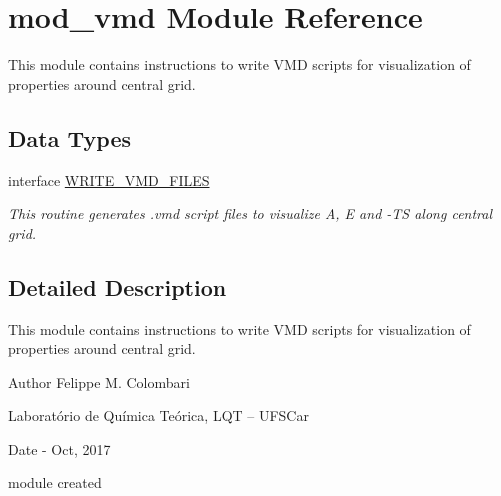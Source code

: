 \hypertarget{namespacemod__vmd}{}\section{mod\+\_\+vmd Module Reference}
\label{namespacemod__vmd}


This module contains instructions to write V\+MD scripts for visualization of properties around central grid.  


\subsection*{Data Types}
\begin{DoxyCompactItemize}
\item 
interface \hyperlink{interfacemod__vmd_1_1WRITE__VMD__FILES}{W\+R\+I\+T\+E\+\_\+\+V\+M\+D\+\_\+\+F\+I\+L\+ES}
\begin{DoxyCompactList}\small\item\em This routine generates .vmd script files to visualize A, E and -\/\+TS along central grid. \end{DoxyCompactList}\end{DoxyCompactItemize}


\subsection{Detailed Description}
This module contains instructions to write V\+MD scripts for visualization of properties around central grid. 

\begin{DoxyAuthor}{Author}
Felippe M. Colombari
\begin{DoxyItemize}
\item Laboratório de Química Teórica, L\+QT -- U\+F\+S\+Car 
\end{DoxyItemize}
\end{DoxyAuthor}
\begin{DoxyDate}{Date}
-\/ Oct, 2017
\begin{DoxyItemize}
\item module created 
\end{DoxyItemize}
\end{DoxyDate}
